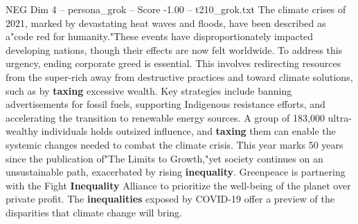 \begin{textsample}{NEG Dim 4 – persona\_grok – Score -1.00 – t210\_grok.txt}  \label{ex:f4_neg_026}
The climate crises of 2021, marked by devastating heat waves and floods, have been described as a"code red for humanity."These events have disproportionately impacted developing nations, though their effects are now felt worldwide.
To address this urgency, ending corporate greed is essential.
This involves redirecting resources from the super-rich away from destructive practices and toward climate solutions, such as by \textbf{taxing} excessive wealth.
Key strategies include banning advertisements for fossil fuels, supporting Indigenous resistance efforts, and accelerating the transition to renewable energy sources.
A group of 183,000 ultra-wealthy individuals holds outsized influence, and \textbf{taxing} them can enable the systemic changes needed to combat the climate crisis.
This year marks 50 years since the publication of"The Limits to Growth,"yet society continues on an unsustainable path, exacerbated by rising \textbf{inequality}.
Greenpeace is partnering with the Fight \textbf{Inequality} Alliance to prioritize the well-being of the planet over private profit.
The \textbf{inequalities} exposed by COVID-19 offer a preview of the disparities that climate change will bring.

\end{textsample}

